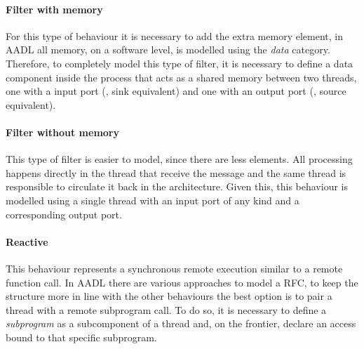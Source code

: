 \paragraph{Filter with memory} For this type of behaviour it is necessary to add the extra memory element, in AADL all memory, on a software level, is modelled using the \textit{data} category. Therefore, to completely model this type of filter, it is necessary to define a data component inside the process that acts as a shared memory between two threads, one with a input port (\ie, sink equivalent) and one with an output port (\ie, source equivalent).
\paragraph{Filter without memory} This type of filter is easier to model, since there are less elements. All processing happens directly in the thread that receive the message and the same thread is responsible to circulate it back in the architecture. Given this, this behaviour is modelled using a single thread with an input port of any kind and a corresponding output port.
\paragraph{Reactive} This behaviour represents a synchronous remote execution similar to a remote function call. In AADL there are various approaches to model a RFC, to keep the structure more in line with the other behaviours the best option is to pair a thread with a remote subprogram call. To do so, it is necessary to define a \textit{subprogram} as a subcomponent of a thread and, on the frontier, declare an access bound to that specific subprogram.

